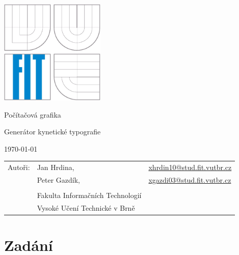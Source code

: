 \documentclass[12pt,a4paper,titlepage,final]{report}
\makeatletter
\newcommand\Course{Počítačová grafika}
\newcommand\WorkTitle{Generátor kynetické typografie}
\newcommand\AuthorA{Jan Hrdina}
\newcommand\AuthorAEmail{xhrdin10@stud.fit.vutbr.cz}
\newcommand\AuthorB{Peter Gazdík}
\newcommand\AuthorBEmail{xgazdi03@stud.fit.vutbr.cz}
\newcommand\Faculty{Fakulta Informačních Technologií}
\newcommand\School{Vysoké Učení Technické v Brně}
\makeatother
\begin{document}
	\begin{titlepage}
	\begin{center}
		\includegraphics[height=5cm]{images/logo.eps}
	\end{center}
	\vfill
	\begin{center}
		\begin{Large}
			\Course\\
		\end{Large}
		\bigskip
		\begin{Huge}
			\WorkTitle\\
		\end{Huge}
	\end{center}
	\vfill
	\begin{center}
		\begin{large}
			\today
		\end{large}
	\end{center}
	\vfill
	\begin{flushleft}
		\begin{large}
			\begin{tabular}{lll}
				Autoři: & \AuthorA, & \url{\AuthorAEmail} \\
				        & \AuthorB, & \url{\AuthorBEmail} \\
				& & \\
				& \Faculty \\
				& \School \\
			\end{tabular}
		\end{large}
	\end{flushleft}
\end{titlepage}



\newpage
\chapter{Zadání}
\end{document}
